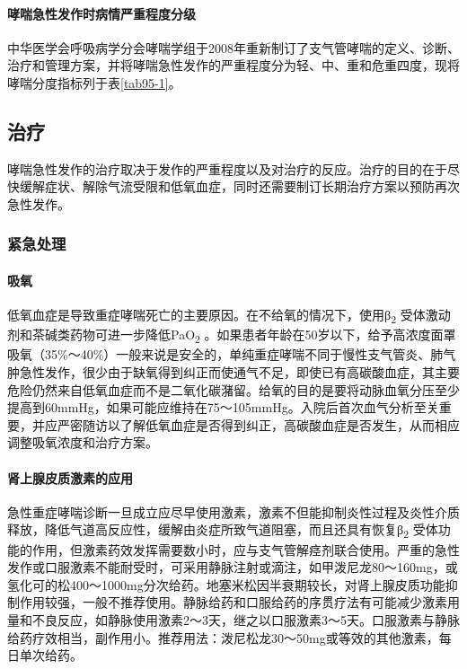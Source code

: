 \paragraph{哮喘急性发作时病情严重程度分级}

中华医学会呼吸病学分会哮喘学组于2008年重新制订了支气管哮喘的定义、诊断、治疗和管理方案，并将哮喘急性发作的严重程度分为轻、中、重和危重四度，现将哮喘分度指标列于表\ref{tab95-1}。

\subsection{治疗}

哮喘急性发作的治疗取决于发作的严重程度以及对治疗的反应。治疗的目的在于尽快缓解症状、解除气流受限和低氧血症，同时还需要制订长期治疗方案以预防再次急性发作。

\subsubsection{紧急处理}

\paragraph{吸氧}

低氧血症是导致重症哮喘死亡的主要原因。在不给氧的情况下，使用β\textsubscript{2}
受体激动剂和茶碱类药物可进一步降低PaO\textsubscript{2}
。如果患者年龄在50岁以下，给予高浓度面罩吸氧（35\%～40\%）一般来说是安全的，单纯重症哮喘不同于慢性支气管炎、肺气肿急性发作，很少由于缺氧得到纠正而使通气不足，即使已有高碳酸血症，其主要危险仍然来自低氧血症而不是二氧化碳潴留。给氧的目的是要将动脉血氧分压至少提高到60mmHg，如果可能应维持在75～105mmHg。入院后首次血气分析至关重要，并应严密随访以了解低氧血症是否得到纠正，高碳酸血症是否发生，从而相应调整吸氧浓度和治疗方案。

\paragraph{肾上腺皮质激素的应用}

急性重症哮喘诊断一旦成立应尽早使用激素，激素不但能抑制炎性过程及炎性介质释放，降低气道高反应性，缓解由炎症所致气道阻塞，而且还具有恢复β\textsubscript{2}
受体功能的作用，但激素药效发挥需要数小时，应与支气管解痉剂联合使用。严重的急性发作或口服激素不能耐受时，可采用静脉注射或滴注，如甲泼尼龙80～160mg，或氢化可的松400～1000mg分次给药。地塞米松因半衰期较长，对肾上腺皮质功能抑制作用较强，一般不推荐使用。静脉给药和口服给药的序贯疗法有可能减少激素用量和不良反应，如静脉使用激素2～3天，继之以口服激素3～5天。口服激素与静脉给药疗效相当，副作用小。推荐用法：泼尼松龙30～50mg或等效的其他激素，每日单次给药。

